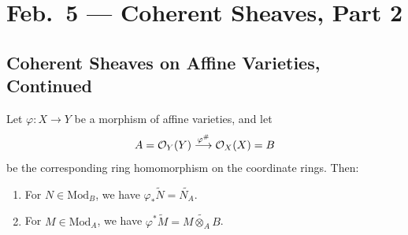 \chapter{Feb.~5 --- Coherent Sheaves, Part 2}

\section{Coherent Sheaves on Affine Varieties, Continued}

\begin{prop}
  Let $\varphi : X \to Y$ be a morphism
  of affine varieties, and let
  \[
    A = \mathcal{O}_Y(Y)
    \overset{\varphi^\#}{\longrightarrow}
    \mathcal{O}_X(X) = B
  \]
  be the corresponding
  ring homomorphism on the coordinate
  rings. Then:
  \begin{enumerate}
    \item For $N \in \mathrm{Mod}_B$,
      we have $\varphi_* \widetilde{N} = \widetilde{N_A}$.
    \item For $M \in \mathrm{Mod}_A$,
      we have $\varphi^* \widetilde{M} = \widetilde{M \otimes_A B}$.
  \end{enumerate}
\end{prop}

